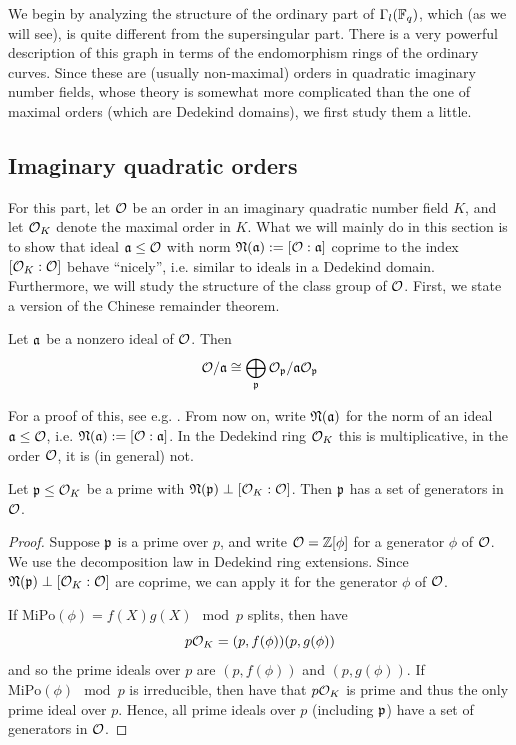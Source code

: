 
We begin by analyzing the structure of the ordinary part of $\Gamma_l(\mathbb{F}_q)$, which (as we will see), is quite different from the supersingular part.
There is a very powerful description of this graph in terms of the endomorphism rings of the ordinary curves.
Since these are (usually non-maximal) orders in quadratic imaginary number fields, whose theory is somewhat more complicated than the one of maximal orders (which are Dedekind domains), we first study them a little.

\subsection{Imaginary quadratic orders}
For this part, let $\mathcal{O}$ be an order in an imaginary quadratic number field $K$, and let $\mathcal{O}_K$ denote the maximal order in $K$.
What we will mainly do in this section is to show that ideal $\mathfrak{a} \leq \mathcal{O}$ with norm $\mathfrak{N}(\mathfrak{a}) := [\mathcal{O} : \mathfrak{a}]$ coprime to the index $[\mathcal{O}_K : \mathcal{O}]$ behave ``nicely'', i.e. similar to ideals in a Dedekind domain.
Furthermore, we will study the structure of the class group of $\mathcal{O}$.
First, we state a version of the Chinese remainder theorem.
\begin{lemma}
    \label{prop:chinese_remainder_theorem_variant}
    Let $\mathfrak{a}$ be a nonzero ideal of $\mathcal{O}$. Then
    \begin{equation*}
        \mathcal{O}/\mathfrak{a} \cong \bigoplus_{\mathfrak{p}} \mathcal{O}_{\mathfrak{p}}/\mathfrak{a}\mathcal{O}_{\mathfrak{p}}
    \end{equation*}
\end{lemma}
For a proof of this, see e.g. \cite[Prop.~I.12.3]{neukirch}.
From now on, write $\mathfrak{N}(\mathfrak{a})$ for the norm of an ideal $\mathfrak{a} \leq \mathcal{O}$, i.e. $\mathfrak{N}(\mathfrak{a}) := [\mathcal{O} : \mathfrak{a}]$.
In the Dedekind ring $\mathcal{O}_K$ this is multiplicative, in the order $\mathcal{O}$, it is (in general) not.
\begin{lemma}
    Let $\mathfrak{p} \leq \mathcal{O}_K$ be a prime with $\mathfrak{N}(\mathfrak{p}) \perp [\mathcal{O}_K : \mathcal{O}]$.
    Then $\mathfrak{p}$ has a set of generators in $\mathcal{O}$.
\end{lemma}
\begin{proof}
    Suppose $\mathfrak{p}$ is a prime over $p$, and write $\mathcal{O} = \mathbb{Z}[\phi]$ for a generator $\phi$ of $\mathcal{O}$.
    We use the decomposition law in Dedekind ring extensions.
    Since $\mathfrak{N}(\mathfrak{p}) \perp [\mathcal{O}_K : \mathcal{O}]$ are coprime, we can apply it for the generator $\phi$ of $\mathcal{O}$.

    If $\mathrm{MiPo}(\phi) = f(X)g(X) \mod p$ splits, then have
    \begin{equation*}
        p\mathcal{O}_K = (p, f(\phi))(p, g(\phi))
    \end{equation*}
    and so the prime ideals over $p$ are $(p, f(\phi))$ and $(p, g(\phi))$.
    If $\mathrm{MiPo}(\phi) \mod p$ is irreducible, then have that $p\mathcal{O}_K$ is prime and thus the only prime ideal over $p$.
    Hence, all prime ideals over $p$ (including $\mathfrak{p}$) have a set of generators in $\mathcal{O}$.
\end{proof}
